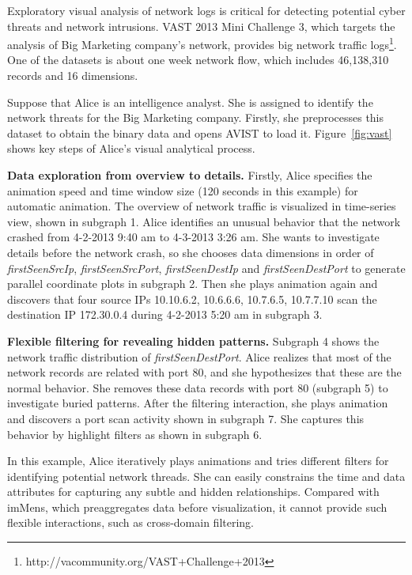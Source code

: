 Exploratory visual analysis of network logs is critical for detecting potential cyber threats and network intrusions. VAST 2013 Mini Challenge 3, which targets the analysis of Big Marketing company's network, provides big network traffic logs\footnote{http://vacommunity.org/VAST+Challenge+2013}. One of the datasets is about one week network flow, which includes 46,138,310 records and 16 dimensions.%

Suppose that Alice is an intelligence analyst. She is assigned to identify the network threats for the Big Marketing company. Firstly, she preprocesses this dataset to obtain the binary data and opens AVIST to load it. Figure~\ref{fig:vast} shows key steps of Alice's visual analytical process. 


\textbf{Data exploration from overview to details.} Firstly, Alice specifies the animation speed and time window size (120 seconds in this example) for automatic animation. The overview of network traffic is visualized in time-series view, shown in subgraph 1. Alice identifies an unusual behavior that the network crashed from 4-2-2013 9:40 am to 4-3-2013 3:26 am. She wants to investigate details before the network crash, so she chooses data dimensions in order of \emph{firstSeenSrcIp}, \emph{firstSeenSrcPort}, \emph{firstSeenDestIp} and \emph{firstSeenDestPort} to generate parallel coordinate plots in subgraph 2. Then she plays animation again and discovers that four source IPs 10.10.6.2, 10.6.6.6, 10.7.6.5, 10.7.7.10 scan the destination IP 172.30.0.4 during 4-2-2013 5:20 am in subgraph 3. 

\textbf{Flexible filtering for revealing hidden patterns.}
Subgraph 4 shows the network traffic distribution of \emph{firstSeenDestPort}. Alice realizes that most of the network records are related with port 80, and she hypothesizes  that these are the normal behavior. She removes these data records with port 80 (subgraph 5) to investigate buried patterns. After the filtering interaction, she plays animation and discovers a port scan activity shown in subgraph 7. She captures this behavior by highlight filters as shown in subgraph 6.  

In this example, Alice iteratively plays animations and tries different filters for identifying potential network threads. She can easily constrains the time and data attributes for capturing any subtle and hidden relationships. Compared with imMens, which preaggregates data before visualization, it cannot provide such flexible interactions, such as cross-domain filtering.
  



